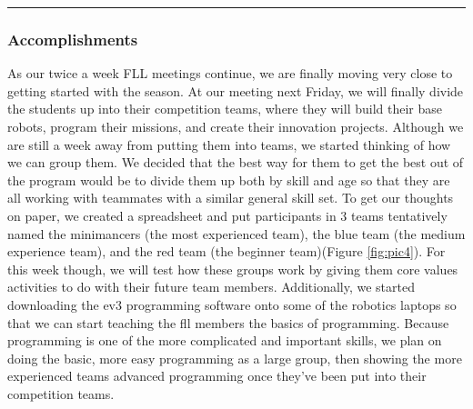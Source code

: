 \noindent\hfil\rule{\textwidth}{.4pt}\hfil

\subsubsection*{Accomplishments}
As our twice a week FLL meetings continue, we are finally moving very close to getting started with the season. At our meeting next Friday, we will finally divide the students up into their competition teams, where they will build their base robots, program their missions, and create their innovation projects. Although we are still a week away from putting them into teams, we started thinking of how we can group them. We decided that the best way for them to get the best out of the program would be to divide them up both by skill and age so that they are all working with teammates with a similar general skill set. To get our thoughts on paper, we created a spreadsheet and put participants in 3 teams tentatively named the minimancers (the most experienced team), the blue team (the medium experience team), and the red team (the beginner team)(Figure \ref{fig:pic4}). For this week though, we will test how these groups work by giving them core values activities to do with their future team members.
Additionally, we started downloading the ev3 programming software onto some of the robotics laptops so that we can start teaching the fll members the basics of programming. Because programming is one of the more complicated and important skills, we plan on doing the basic, more easy programming as a large group, then showing the more experienced teams advanced programming once they’ve been put into their competition teams.

